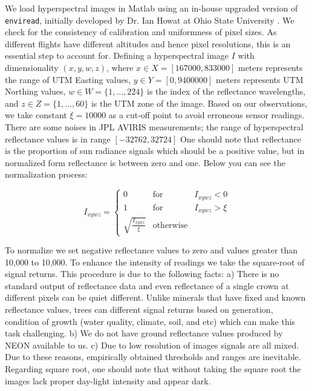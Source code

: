\documentclass[remotesensing,article,accept,moreauthors,pdftex,12pt,a4paper]{mdpi}
\begin{document}
We load hyperspectral images in Matlab using an in-house upgraded version of \texttt{enviread}, initially developed by Dr. Ian Howat at Ohio State University \cite{howat2007enviread}. We check for the consistency of calibration and uniformness of pixel sizes. As different flights have different altitudes and hence pixel resolutions, this is an essential step to account for. Defining a hyperspectral image $I$ with dimensionality $(x,y,w,z)$, where $x \in X = [167000, 833000 ]$ meters represents the range of UTM Easting values, $y \in Y = [0, 9400000]$ meters represents UTM Northing values, $w \in W = \{1, \dotsc, 224\}$ is the index of the reflectance wavelengths, and $z \in Z = \{1, \dotsc, 60 \}$ is the UTM zone of the image. Based on our observations, we take constant $\xi = 10000$ as a cut-off point to avoid erroneous sensor readings. There are some noises in JPL AVIRIS measurements; the range of hyperspectral reflectance values is in range $[-32762, 32724]$ One should note that reflectance is the proportion of sun radiance signals which should be a positive value, but in normalized form reflectance is between zero and one. Below you can see the normalization process:

\begin{equation}
I_{xywz} = \left\{ \begin{array}{rcl}
0 & \mbox{for} & I_{xywz} < 0 \\ 
1 & \mbox{for} & I_{xywz} > \xi \\
\sqrt{\frac{I_{xywz}}{\xi}} & \mbox{otherwise} & 
\end{array}\right.
\end{equation}

To normalize we set negative reflectance values to zero and values greater than 10,000 to 10,000. To enhance the intensity of readings we take the square-root of signal returns. This procedure is due to the following facts: a) There is no standard output of reflectance data and even reflectance of a single crown at different pixels can be quiet different. Unlike minerals that have fixed and known reflectance values, trees can different signal returns based on generation, condition of growth (water quality, climate, soil, and etc) which can make this task challenging. b) We do not have ground reflectance values produced by NEON available to us. c) Due to low resolution of images signals are all mixed. Due to these reasons, empirically obtained thresholds and ranges are inevitable. Regarding square root, one should note that without taking the square root the images lack proper day-light intensity and appear dark.
\end{document}
